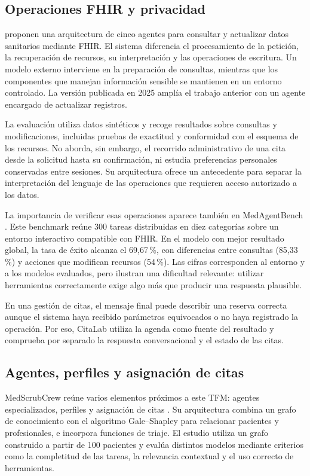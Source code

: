 \subsection{Operaciones FHIR y privacidad}

\citet{demaio2025privacy} proponen una arquitectura de cinco agentes para consultar y actualizar datos sanitarios mediante FHIR. El sistema diferencia el procesamiento de la petición, la recuperación de recursos, su interpretación y las operaciones de escritura. Un modelo externo interviene en la preparación de consultas, mientras que los componentes que manejan información sensible se mantienen en un entorno controlado. La versión publicada en 2025 amplía el trabajo anterior con un agente encargado de actualizar registros.

La evaluación utiliza datos sintéticos y recoge resultados sobre consultas y modificaciones, incluidas pruebas de exactitud y conformidad con el esquema de los recursos. No aborda, sin embargo, el recorrido administrativo de una cita desde la solicitud hasta su confirmación, ni estudia preferencias personales conservadas entre sesiones. Su arquitectura ofrece un antecedente para separar la interpretación del lenguaje de las operaciones que requieren acceso autorizado a los datos.

La importancia de verificar esas operaciones aparece también en MedAgentBench \citep{jiang2025medagentbench}. Este benchmark reúne 300 tareas distribuidas en diez categorías sobre un entorno interactivo compatible con FHIR. En el modelo con mejor resultado global, la tasa de éxito alcanza el 69,67\,\%, con diferencias entre consultas (85,33\,\%) y acciones que modifican recursos (54\,\%). Las cifras corresponden al entorno y a los modelos evaluados, pero ilustran una dificultad relevante: utilizar herramientas correctamente exige algo más que producir una respuesta plausible.

En una gestión de citas, el mensaje final puede describir una reserva correcta aunque el sistema haya recibido parámetros equivocados o no haya registrado la operación. Por eso, CitaLab utiliza la agenda como fuente del resultado y comprueba por separado la respuesta conversacional y el estado de las citas.

\subsection{Agentes, perfiles y asignación de citas}

MedScrubCrew reúne varios elementos próximos a este TFM: agentes especializados, perfiles y asignación de citas \citep{ruiz2025medscrubcrew}. Su arquitectura combina un grafo de conocimiento con el algoritmo Gale--Shapley para relacionar pacientes y profesionales, e incorpora funciones de triaje. El estudio utiliza un grafo construido a partir de 100 pacientes y evalúa distintos modelos mediante criterios como la completitud de las tareas, la relevancia contextual y el uso correcto de herramientas.


